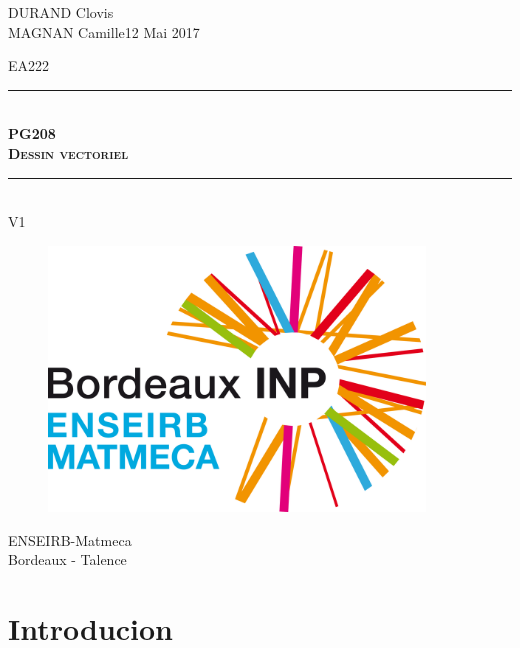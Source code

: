 \documentclass[11pt]{article}
\newcommand{\HRule}{\rule{\linewidth}{0.5mm}}
\begin{document}
\noindent 
DURAND Clovis \\ MAGNAN Camille\hfill{12 Mai 2017}



\vspace{2cm}
\begin{center}
    \Large{EA222} %
    \HRule \\[0.1cm]
    {\textsc{\LARGE \textbf{PG208 \\ Dessin vectoriel}}}\\
    \HRule\\[02cm]
    \Large{V1}
\end{center}
\vspace{1,5cm}

\begin{figure}[htbp]
    \begin{center}
        \includegraphics[width=10cm]{Logo-quadri.png}
    \end{center}
\end{figure}

\vspace{1cm}
\begin{center}
    \Large{ENSEIRB-Matmeca \\ Bordeaux - Talence}
\end{center}

\vspace{2cm}

\newpage
\tableofcontents
\listoffigures
\newpage 


\section{Introducion}
\end{document}
